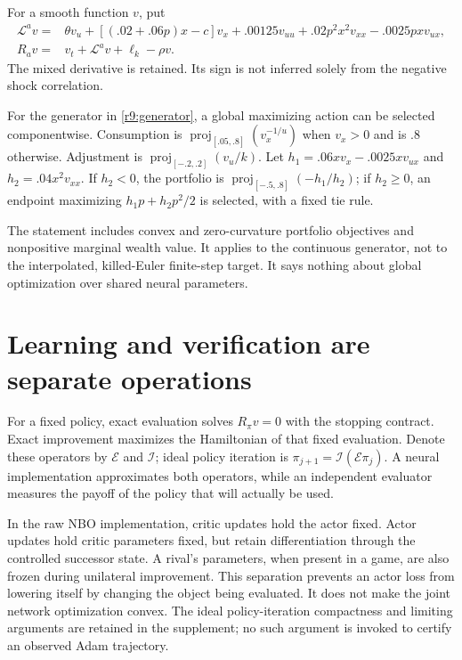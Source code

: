 For a smooth function $v$, put
\begin{align}
 \mathcal L^av={}&\theta v_u+[(.02+.06p)x-c]v_x
   +.00125v_{uu}+.02p^2x^2v_{xx}-.0025pxv_{ux},\\
 R_av={}&v_t+\mathcal L^av+\ell_k-\rho v.\label{r9:generator}
\end{align}
The mixed derivative is retained. Its sign is not inferred solely from the negative shock correlation.

\begin{proposition}\label{r9:selection}
For the generator in \eqref{r9:generator}, a global maximizing action can be selected componentwise. Consumption is $\operatorname{proj}_{[.05,.8]}(v_x^{-1/u})$ when $v_x>0$ and is $.8$ otherwise. Adjustment is $\operatorname{proj}_{[-.2,.2]}(v_u/k)$. Let $h_1=.06xv_x-.0025xv_{ux}$ and $h_2=.04x^2v_{xx}$. If $h_2<0$, the portfolio is $\operatorname{proj}_{[-.5,.8]}(-h_1/h_2)$; if $h_2\geq0$, an endpoint maximizing $h_1p+h_2p^2/2$ is selected, with a fixed tie rule.
\end{proposition}
The statement includes convex and zero-curvature portfolio objectives and nonpositive marginal wealth value. It applies to the continuous generator, not to the interpolated, killed-Euler finite-step target. It says nothing about global optimization over shared neural parameters.

\section{Learning and verification are separate operations}\label{r9:algorithm}
For a fixed policy, exact evaluation solves $R_\pi v=0$ with the stopping contract. Exact improvement maximizes the Hamiltonian of that fixed evaluation. Denote these operators by $\mathcal E$ and $\mathcal I$; ideal policy iteration is $\pi_{j+1}=\mathcal I(\mathcal E\pi_j)$. A neural implementation approximates both operators, while an independent evaluator measures the payoff of the policy that will actually be used.

In the raw NBO implementation, critic updates hold the actor fixed. Actor updates hold critic parameters fixed, but retain differentiation through the controlled successor state. A rival's parameters, when present in a game, are also frozen during unilateral improvement. This separation prevents an actor loss from lowering itself by changing the object being evaluated. It does not make the joint network optimization convex. The ideal policy-iteration compactness and limiting arguments are retained in the supplement; no such argument is invoked to certify an observed Adam trajectory.

